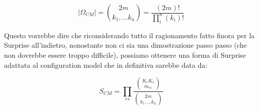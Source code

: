 \[
| \Omega_{CM} | = \binom{2m}{k_1, \ldots k_n} = \frac{(2m)!}{\prod \limits_i^n (k_i)!}
\]

Questo vorrebbe dire che riconsiderando tutto il ragionamento fatto
finora per la Surprise all'indietro, nonostante non ci sia una
dimostrazione passo passo (che non dovrebbe essere troppo difficile),
possiamo ottenere una forma di Surprise adattata al configuration model
che in definitiva sarebbe data da:

\[
S_{CM} = \prod_{rs} \frac{ \binom{K_r K_s}{m_{rs}}}{\binom{2m}{k_1, \ldots k_n}}
\]
